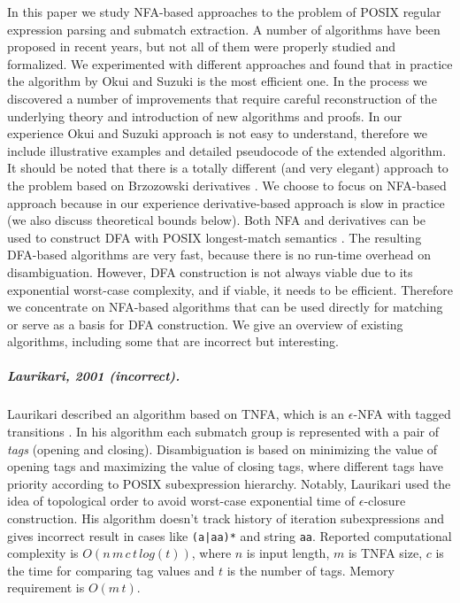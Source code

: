 \documentclass[AMA,STIX1COL]{WileyNJD-v2}
\begin{document}
In this paper we study NFA-based approaches to the problem of POSIX regular expression parsing and submatch extraction.
A number of algorithms have been proposed in recent years,
but not all of them were properly studied and formalized.
We experimented with different approaches and found that in practice the algorithm by Okui and Suzuki \cite{OS13} is the most efficient one.
In the process we discovered a number of improvements
that require careful reconstruction of the underlying theory and introduction of new algorithms and proofs.
In our experience Okui and Suzuki approach is not easy to understand,
therefore we include illustrative examples and detailed pseudocode of the extended algorithm.
%
It should be noted that there is a totally different (and very elegant) approach to the problem
based on Brzozowski derivatives \cite{SL14}.
We choose to focus on NFA-based approach because
in our experience derivative-based approach is slow in practice
(we also discuss theoretical bounds below).
%
Both NFA and derivatives can be used to construct DFA with POSIX longest-match semantics \cite{SL13} \cite{Bor15} \cite{Tro17}.
The resulting DFA-based algorithms are very fast, because there is no run-time overhead on disambiguation.
However, DFA construction is not always viable due to its exponential worst-case complexity,
and if viable, it needs to be efficient.
Therefore we concentrate on NFA-based algorithms
that can be used directly for matching or serve as a basis for DFA construction.
We give an overview of existing algorithms, including some that are incorrect but interesting.

\subparagraph{Laurikari, 2001 (incorrect).}

Laurikari described an algorithm based on TNFA, which is an $\epsilon$-NFA with tagged transitions \cite{Lau01}.
In his algorithm each submatch group is represented with a pair of \emph{tags} (opening and closing).
Disambiguation is based on minimizing the value of opening tags and maximizing the value of closing tags, where
different tags have priority according to POSIX subexpression hierarchy.
Notably, Laurikari used the idea of topological order to avoid worst-case exponential time of $\epsilon$-closure construction.
His algorithm doesn't track history of iteration subexpressions and gives incorrect result in cases like \texttt{(a|aa)*} and string \texttt{aa}.
Reported computational complexity is $O(n \, m \, c \, t \, log(t))$, where
$n$ is input length,
$m$ is TNFA size,
$c$ is the time for comparing tag values
and $t$ is the number of tags.
Memory requirement is $O(m \, t)$.
\end{document}
